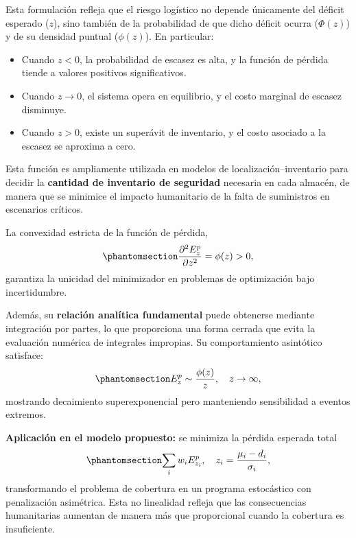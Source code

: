 \documentclass[
  spanish,
  us-letterpaper,
  DIV=11,
  numbers=noendperiod]{scrreprt}
\providecommand{\tightlist}{%
  \setlength{\itemsep}{0pt}\setlength{\parskip}{0pt}}
\numberwithin{equation}{section}
\begin{document}
Esta formulación refleja que el riesgo logístico no depende únicamente
del déficit esperado (\(z\)), sino también de la probabilidad de que
dicho déficit ocurra (\(\Phi(z)\)) y de su densidad puntual
(\(\phi(z)\)). En particular:

\begin{itemize}
\tightlist
\item
  Cuando \(z < 0\), la probabilidad de escasez es alta, y la función de
  pérdida tiende a valores positivos significativos.\\
\item
  Cuando \(z \to 0\), el sistema opera en equilibrio, y el costo
  marginal de escasez disminuye.\\
\item
  Cuando \(z > 0\), existe un superávit de inventario, y el costo
  asociado a la escasez se aproxima a cero.
\end{itemize}

Esta función es ampliamente utilizada en modelos de
localización--inventario para decidir la \textbf{cantidad de inventario
de seguridad} necesaria en cada almacén, de manera que se minimice el
impacto humanitario de la falta de suministros en escenarios críticos.

La convexidad estricta de la función de pérdida,
\begin{equation}\phantomsection\label{eq-phi}{
\frac{\partial^2 E_z^p}{\partial z^2} = \phi(z) > 0,
}\end{equation} garantiza la unicidad del minimizador en problemas de
optimización bajo incertidumbre.

Además, su \textbf{relación analítica fundamental} puede obtenerse
mediante integración por partes, lo que proporciona una forma cerrada
que evita la evaluación numérica de integrales impropias. Su
comportamiento asintótico satisface:
\begin{equation}\phantomsection\label{eq-E_phi}{
E_z^p \sim \frac{\phi(z)}{z}, \quad z \to \infty,
}\end{equation} mostrando decaimiento superexponencial pero manteniendo
sensibilidad a eventos extremos.

\textbf{Aplicación en el modelo propuesto:} se minimiza la pérdida
esperada total \begin{equation}\phantomsection\label{eq-perdida}{
\sum_i w_i E_{z_i}^p, \quad z_i = \frac{\mu_i - d_i}{\sigma_i},
}\end{equation} transformando el problema de cobertura en un programa
estocástico con penalización asimétrica. Esta no linealidad refleja que
las consecuencias humanitarias aumentan de manera más que proporcional
cuando la cobertura es insuficiente.
\end{document}
